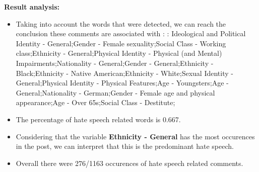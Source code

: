 \documentclass[11pt]{article}
\begin{document}
\textbf{\Large Result analysis:}

\begin{itemize}\item Taking into account the words that were detected, we can reach the conclusion these comments are associated with : : Ideological and Political Identity - General;Gender - Female sexuality;Social Class - Working class;Ethnicity - General;Physical Identity - Physical (and Mental) Impairments;Nationality - General;Gender - General;Ethnicity - Black;Ethnicity - Native American;Ethnicity - White;Sexual Identity - General;Physical Identity - Physical Features;Age - Youngsters;Age - General;Nationality - German;Gender - Female age and physical appearance;Age - Over 65s;Social Class - Destitute;%

\item The percentage of hate speech related words is 0.667.

\item Considering that the variable \textbf{Ethnicity - General} has the most occurences in the post, we can interpret that this is the predominant hate speech.

\item Overall there were 276/1163 occurences of hate speech related comments.\end{itemize}
\end{document}
